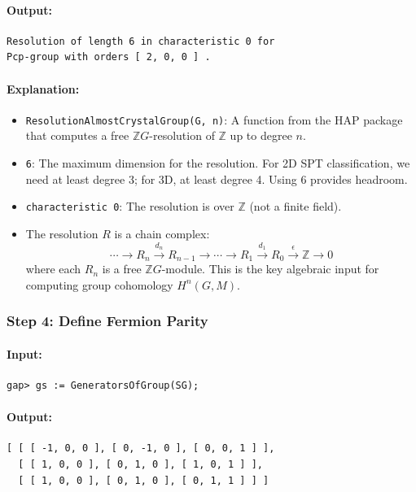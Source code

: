\documentclass{SciPost}
\begin{document}
\paragraph{Output:}
\begin{verbatim}
Resolution of length 6 in characteristic 0 for 
Pcp-group with orders [ 2, 0, 0 ] .
\end{verbatim}

\paragraph{Explanation:}
\begin{itemize}
    \item \texttt{ResolutionAlmostCrystalGroup(G, n)}: A function from the HAP package that computes a free $\mathbb{Z}G$-resolution of $\mathbb{Z}$ up to degree $n$.
    \item \texttt{6}: The maximum dimension for the resolution. For 2D SPT classification, we need at least degree 3; for 3D, at least degree 4. Using 6 provides headroom.
    \item \texttt{characteristic 0}: The resolution is over $\mathbb{Z}$ (not a finite field).
    \item The resolution $R$ is a chain complex:
    \begin{equation}
    \cdots \to R_n \xrightarrow{d_n} R_{n-1} \to \cdots \to R_1 \xrightarrow{d_1} R_0 \xrightarrow{\epsilon} \mathbb{Z} \to 0
    \end{equation}
    where each $R_n$ is a free $\mathbb{Z}G$-module. This is the key algebraic input for computing group cohomology $H^n(G, M)$.
\end{itemize}

\subsubsection{Step 4: Define Fermion Parity}

\paragraph{Input:}
\begin{verbatim}
gap> gs := GeneratorsOfGroup(SG);
\end{verbatim}

\paragraph{Output:}
\begin{verbatim}
[ [ [ -1, 0, 0 ], [ 0, -1, 0 ], [ 0, 0, 1 ] ], 
  [ [ 1, 0, 0 ], [ 0, 1, 0 ], [ 1, 0, 1 ] ], 
  [ [ 1, 0, 0 ], [ 0, 1, 0 ], [ 0, 1, 1 ] ] ]
\end{verbatim}
\end{document}
